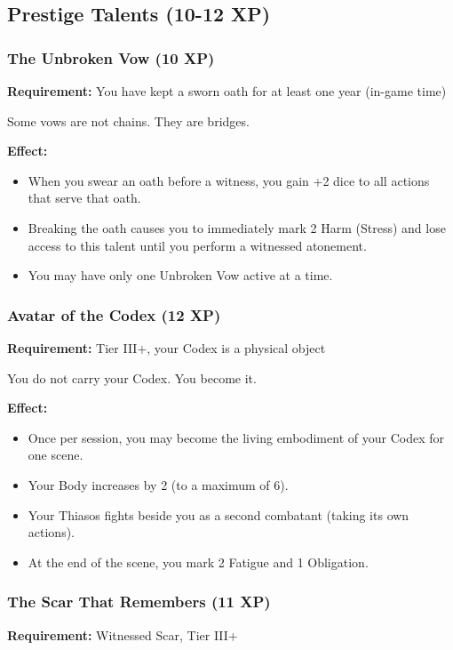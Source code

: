 \subsection{Prestige Talents (10-12 XP)}

\subsubsection{The Unbroken Vow (10 XP)}

\textbf{Requirement:} You have kept a sworn oath for at least one year (in-game time)

Some vows are not chains. They are bridges.

\textbf{Effect:}
\begin{itemize}
\item When you swear an oath before a witness, you gain +2 dice to all actions that serve that oath.
\item Breaking the oath causes you to immediately mark 2 Harm (Stress) and lose access to this talent until you perform a witnessed atonement.
\item You may have only one Unbroken Vow active at a time.
\end{itemize}

\subsubsection{Avatar of the Codex (12 XP)}

\textbf{Requirement:} Tier III+, your Codex is a physical object

You do not carry your Codex. You become it.

\textbf{Effect:}
\begin{itemize}
\item Once per session, you may become the living embodiment of your Codex for one scene.
\item Your Body increases by 2 (to a maximum of 6).
\item Your Thiasos fights beside you as a second combatant (taking its own actions).
\item At the end of the scene, you mark 2 Fatigue and 1 Obligation.
\end{itemize}

\subsubsection{The Scar That Remembers (11 XP)}

\textbf{Requirement:} Witnessed Scar, Tier III+

